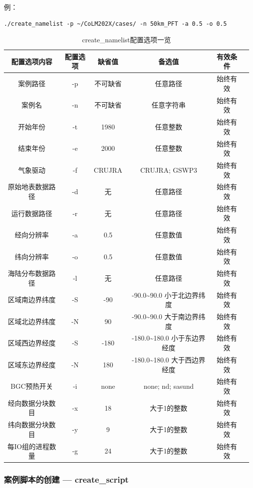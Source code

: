例：
\begin{lstlisting}[xleftmargin=2.5em]
./create_namelist -p ~/CoLM202X/cases/ -n 50km_PFT -a 0.5 -o 0.5
\end{lstlisting}

\begin{table}[!htbp]
\renewcommand{\arraystretch}{1.5}
\centering
\caption{create\_namelist配置选项一览}\label{tab:createnml_option}
\begin{tabular}{
cccccc} \toprule
\textbf{配置选项内容} & \textbf{配置选项} & \textbf{缺省值} & \textbf{备选值} & \textbf{有效条件}\\ \midrule
案例路径 & -p & 不可缺省 & 任意路径 & 始终有效 \\
案例名  & -n & 不可缺省 & 任意字符串 & 始终有效 \\
开始年份 & -t & 1980 & 任意整数 & 始终有效\\
结束年份 & -e & 2000 & 任意整数 & 始终有效\\
气象驱动 & -f & CRUJRA & CRUJRA; GSWP3  & 始终有效\\
原始地表数据路径 & -d & 无 & 任意路径 & 始终有效\\
运行数据路径 & -r & 无 & 任意路径 & 始终有效\\
经向分辨率 & -a & 0.5 & 任意数值 & 始终有效\\
纬向分辨率 & -o & 0.5 & 任意数值 & 始终有效\\
海陆分布数据路径 & -l & 无 & 任意路径 & 始终有效\\
区域南边界纬度 & -S & -90 & -90.0\textasciitilde90.0 小于北边界纬度 & 始终有效\\
区域北边界纬度 & -N & 90 & -90.0\textasciitilde90.0 大于南边界纬度 & 始终有效\\
区域西边界经度 & -S & -180 & -180.0\textasciitilde180.0 小于东边界经度 & 始终有效\\
区域东边界经度 & -N & 180 & -180.0\textasciitilde180.0 大于西边界经度 & 始终有效\\
BGC预热开关 & -i &none & none; nd; sasund& 始终有效 \\
经向数据分块数目 & -x & 18 & 大于1的整数& 始终有效 \\
纬向数据分块数目 & -y & 9 & 大于1的整数& 始终有效 \\
每IO组的进程数量 & -g & 24 & 大于1的整数& 始终有效 \\
\bottomrule
\end{tabular}
\end{table}

\subsubsection{案例脚本的创建 --- create\_script}

